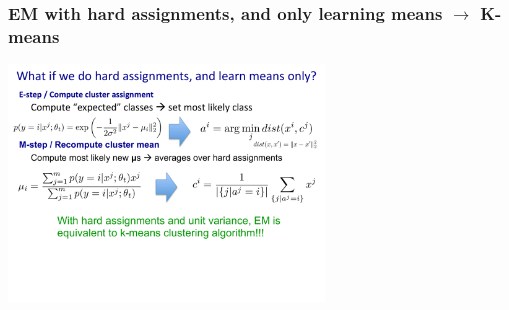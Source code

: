 \subsubsection{EM with hard assignments, and only learning means $\rightarrow$ K-means}

\includegraphics[width=3.3in]{figures/em_to_kmeans.pdf}


